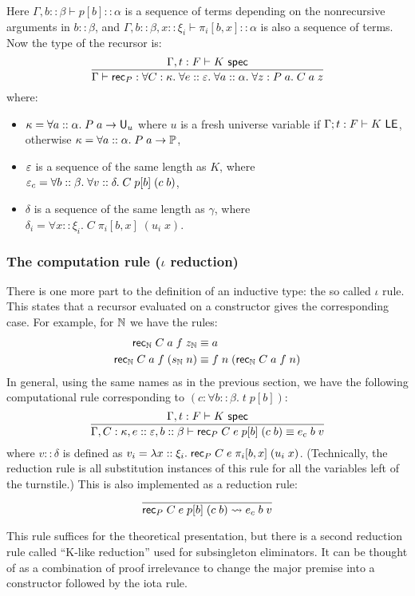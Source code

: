 Here $\Gamma,b::\beta\vdash p[b]::\alpha$ is a sequence of terms depending on the nonrecursive arguments in $b::\beta$, and $\Gamma,b::\beta,x::\xi_i\vdash \pi_i[b,x]::\alpha$ is also a sequence of terms. Now the type of the recursor is:
$$\frac{\Gamma,t:F\vdash K\spec}{\Gamma\vdash\rec_P:\forall C:\kappa.\;\forall e::\vep.\;\forall a::\alpha.\;\forall z:P\;a.\;C\;a\;z}$$
where:
\begin{itemize}
\item $\kappa=\forall a::\alpha.\;P\;a\to\U_u$ where $u$ is a fresh universe variable if $\Gamma;t:F\vdash K\LE$, otherwise $\kappa=\forall a::\alpha.\;P\;a\to\P$,
\item $\vep$ is a sequence of the same length as $K$, where $\vep_c=\forall b::\beta.\;\forall v::\delta.\;C\;p[b]\;(c\;b)$,
\item $\delta$ is a sequence of the same length as $\gamma$, where $\delta_i=\forall x::\xi_i.\;C\;\pi_i[b,x]\;(u_i\;x)$.
\end{itemize}

\subsubsection{The computation rule ($\iota$ reduction)}\label{sec:iota}

There is one more part to the definition of an inductive type: the so called $\iota$ rule. This states that a recursor evaluated on a constructor gives the corresponding case. For example, for $\N$ we have the rules:
%
\begin{align*}
\mathsf{rec}_\N\;C\;a\;f\;z_\N&\equiv a\\
\mathsf{rec}_\N\;C\;a\;f\;(s_\N\;n)&\equiv f\;n\;(\mathsf{rec}_\N\;C\;a\;f\;n)
\end{align*}
%
In general, using the same names as in the previous section, we have the following computational rule corresponding to $(c:\forall b::\beta.\;t\;p[b])$:
$$\frac{\Gamma,t:F\vdash K\spec}{\Gamma,C:\kappa,e::\vep,b::\beta\vdash\rec_P\;C\;e\;p[b]\;(c\;b)\equiv e_c\;b\;v}$$
where $v::\delta$ is defined as $v_i=\lambda x::\xi_i.\;\rec_P\;C\;e\;\pi_i[b,x]\;(u_i\;x)$. (Technically, the reduction rule is all substitution instances of this rule for all the variables left of the turnstile.) This is also implemented as a reduction rule:
$$\frac{}{\rec_P\;C\;e\;p[b]\;(c\;b)\rightsquigarrow e_c\;b\;v}$$

This rule suffices for the theoretical presentation, but there is a second reduction rule called ``K-like reduction'' used for subsingleton eliminators. It can be thought of as a combination of proof irrelevance to change the major premise into a constructor followed by the iota rule.

